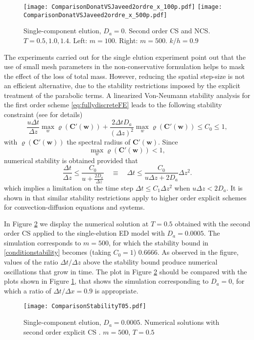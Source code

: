 \documentclass[preprint]{elsarticle}
\theoremstyle{definition}
\newcommand{\bw}{\boldsymbol w}
\newcommand{\bC}{\boldsymbol C}
\begin{document}
\begin{figure}[ht]   
\begin{center} 
\texttt{[image: ComparisonDonatVSJaveed2ordre\_x\_100p.pdf]}
\texttt{[image: ComparisonDonatVSJaveed2ordre\_x\_500p.pdf]}
\end{center}   
\caption{Single-component elution, $D_a=0$. Second order CS and NCS.  $T=0.5, 1.0, 1.4$. Left:
  $m=100$. Right:  $m=500$. $k/h=0.9$  }  
\label{comparison2}  
\end{figure} 

The experiments carried out for the single elution experiment point
out that the  use of  small mesh 
parameters in the non-conservative formulation helps to mask the effect of
the loss of total mass. However, reducing the spatial step-size is not an
efficient alternative, due to the stability restrictions imposed by the
explicit treatment of the parabolic terms. A
 linearized Von-Neumann stability analysis
for the first order scheme \eqref{eq:fullydiscreteFE}  leads to
the following stability constraint (see \cite{Donat1} for details)
\begin{equation*}\frac{u\Delta t}{\Delta z}\max_w \varrho
(\boldsymbol{C'(w)})+\frac{2{\Delta t}D_a}{(\Delta z)^2} \max_w \varrho
(\boldsymbol{C'(w)})\le C_0 \le 1,
\end{equation*}
with $\varrho (\boldsymbol{C'(w)})$ the spectral radius of
$\bC'(\bw)$. Since
\[  \max_w \varrho (\boldsymbol{C'(w)}) < 1, \]
  numerical stability is obtained provided that
 \begin{equation}\label{conditionstability}
 \frac{\Delta t}{\Delta z} \le 
\frac{C_0}{u+\frac{2D_a}{\Delta z}} \quad \equiv \quad  \Delta t\leq \frac{C_0}{u\Delta z+2D_a}\Delta z^2.
\end{equation}
which implies a limitation on the time step
  $\Delta t \leq C_1 \Delta z^2$ when $u\Delta z < 2 D_a$.
It is shown in \cite{Donat1} that similar stability restrictions apply to
higher order explicit schemes for convection-diffusion equations and
systems.

In Figure \ref{fig:stabCS1}  we
display the numerical solution at $T=0.5$ obtained with the second
order CS applied to the single-elution ED model
with  $D_a=0.0005$. The simulation corresponds to  $m=500$, for which
the stability bound in \eqref{conditionstability} becomes (taking
$C_0=1$) 0.6666. As observed in the figure, values of the ratio
$\Delta t/\Delta z$ above the stability bound produce
numerical oscillations that grow in time. The plot in Figure
\ref{fig:stabCS1} should be compared with the plots shown in Figure
\ref{comparison2}, that shows the simulation corresponding to $D_a=0$, for which
a ratio of $\Delta t/\Delta x=0.9$ is appropriate.
\begin{figure}[ht]   
\begin{center} 
\texttt{[image: ComparisonStabilityT05.pdf]}
\end{center}   
\caption{Single-component elution, $D_a=0.0005$. Numerical solutions with second
  order explicit CS . $m=500$, $T=0.5$ }  
\label{fig:stabCS1}  
\end{figure}
\end{document}
